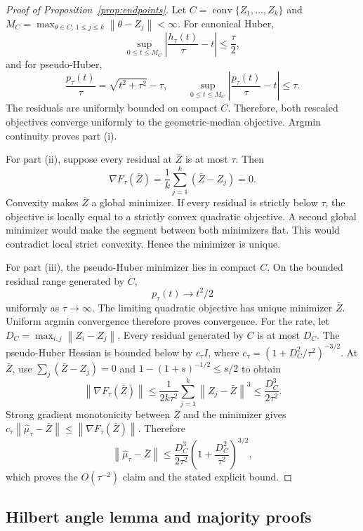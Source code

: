 \documentclass[twoside]{article}
\theoremstyle{definition}
\newcommand{\norm}[1]{\left\lVert #1\right\rVert}
\begin{document}
\begin{proof}[Proof of Proposition~\ref{prop:endpoints}]
Let $C=\operatorname{conv}\{Z_1,\ldots,Z_k\}$ and
$M_C=\max_{\theta\in C,\,1\le j\le k}\norm{\theta-Z_j}<\infty$.
For canonical Huber,
\[
    \sup_{0\le t\le M_C}\left|\frac{h_\tau(t)}{\tau}-t\right|\le\frac\tau2,
\]
and for pseudo-Huber,
\[
    \frac{p_\tau(t)}{\tau}=\sqrt{t^2+\tau^2}-\tau,
    \qquad
    \sup_{0\le t\le M_C}\left|\frac{p_\tau(t)}{\tau}-t\right|\le\tau.
\]
The residuals are uniformly bounded on compact $C$. Therefore, both rescaled objectives converge uniformly to the geometric-median objective. Argmin continuity proves part (i).

For part (ii), suppose every residual at $\bar Z$ is at most $\tau$. Then
\[
    \nabla F_\tau(\bar Z)=\frac1k\sum_{j=1}^k(\bar Z-Z_j)=0.
\]
Convexity makes $\bar Z$ a global minimizer. If every residual is strictly below $\tau$, the objective is locally equal to a strictly convex quadratic objective. A second global minimizer would make the segment between both minimizers flat. This would contradict local strict convexity. Hence the minimizer is unique.

For part (iii), the pseudo-Huber minimizer lies in compact $C$. On the bounded residual range generated by $C$,
\[
    p_\tau(t)\longrightarrow t^2/2
\]
uniformly as $\tau\to\infty$. The limiting quadratic objective has unique minimizer $\bar Z$. Uniform argmin convergence therefore proves convergence. For the rate, let $D_C=\max_{i,j}\norm{Z_i-Z_j}$. Every residual generated by $C$ is at most $D_C$. The pseudo-Huber Hessian is bounded below by $c_\tau I$, where $c_\tau=(1+D_C^2/\tau^2)^{-3/2}$. At $\bar Z$, use $\sum_j(\bar Z-Z_j)=0$ and $1-(1+s)^{-1/2}\le s/2$ to obtain
\[
    \norm{\nabla F_\tau(\bar Z)}
    \le \frac1{2k\tau^2}\sum_{j=1}^k\norm{Z_j-\bar Z}^3
    \le \frac{D_C^3}{2\tau^2}.
\]
Strong gradient monotonicity between $\bar Z$ and the minimizer gives
$c_\tau\norm{\hat\mu_\tau-\bar Z}\le\norm{\nabla F_\tau(\bar Z)}$. Therefore
\begin{equation*}
    \norm{\hat\mu_\tau-\bar Z}
    \le \frac{D_C^3}{2\tau^2}
    \left(1+\frac{D_C^2}{\tau^2}\right)^{3/2},
\end{equation*}
which proves the $O(\tau^{-2})$ claim and the stated explicit bound.
\end{proof}

\subsection{Hilbert angle lemma and majority proofs}\label{app:proof-majority}
\end{document}
